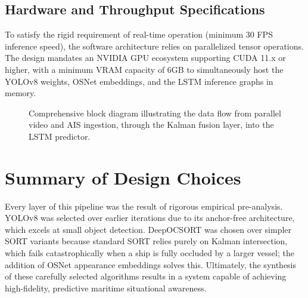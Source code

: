 \subsection{Hardware and Throughput Specifications}
To satisfy the rigid requirement of real-time operation (minimum 30 FPS inference speed), the software architecture relies on parallelized tensor operations. The design mandates an NVIDIA GPU ecosystem supporting CUDA 11.x or higher, with a minimum VRAM capacity of 6GB to simultaneously host the YOLOv8 weights, OSNet embeddings, and the LSTM inference graphs in memory.

\begin{figure}[htb]
\centering
	\caption{Comprehensive block diagram illustrating the data flow from parallel video and AIS ingestion, through the Kalman fusion layer, into the LSTM predictor.}
	\label{fig:detailed_architecture}
\end{figure}

\section{Summary of Design Choices}
Every layer of this pipeline was the result of rigorous empirical pre-analysis. YOLOv8 was selected over earlier iterations due to its anchor-free architecture, which excels at small object detection. DeepOCSORT was chosen over simpler SORT variants because standard SORT relies purely on Kalman intersection, which fails catastrophically when a ship is fully occluded by a larger vessel; the addition of OSNet appearance embeddings solves this. Ultimately, the synthesis of these carefully selected algorithms results in a system capable of achieving high-fidelity, predictive maritime situational awareness.